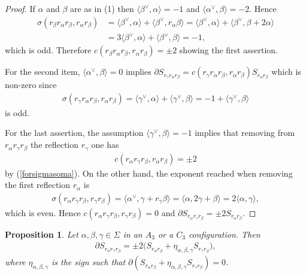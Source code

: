 \documentclass[pdftex]{sigma}
\numberwithin{equation}{section}
\newtheorem{Proposition}[Theorem]{Proposition}
 { \theoremstyle{definition}
\newtheorem{Definition}[Theorem]{Definition}
\newtheorem{Note}[Theorem]{Note}
\newtheorem{Example}[Theorem]{Example}
\newtheorem{Remark}[Theorem]{Remark} }
\begin{document}
\begin{proof}If $\alpha $ and $\beta $ are as in (1) then $\langle \beta ^{\vee},\alpha \rangle =-1$ and $\langle \alpha ^{\vee },\beta\rangle =-2$. Hence
\begin{align*}
\sigma ( r_{\beta }r_{\alpha }r_{\beta },r_{\alpha }r_{\beta } )&=\langle \beta ^{\vee },\alpha \rangle +\langle \beta ^{\vee },r_{\alpha}\beta \rangle =\langle \beta ^{\vee },\alpha \rangle +\langle \beta ^{\vee },\beta
+2\alpha \rangle \\
&=3\langle \beta ^{\vee },\alpha \rangle +\langle \beta ^{\vee },\beta\rangle =-1,
\end{align*}
which is odd. Therefore $c ( r_{\beta }r_{\alpha }r_{\beta },r_{\alpha}r_{\beta } ) =\pm 2$ showing the first assertion.

For the second item, $ \langle \alpha ^{\vee },\beta \rangle =0$ implies $\partial S_{r_{\gamma }r_{\alpha }r_{\beta }}=c(r_{\gamma}r_{\alpha }r_{\beta },r_{\alpha }r_{\beta })S_{r_{\alpha }r_{\beta }}$ which is non-zero since
\begin{gather*}
\sigma (r_{\gamma }r_{\alpha }r_{\beta },r_{\alpha }r_{\beta })= \langle \gamma ^{\vee },\alpha \rangle + \langle \gamma ^{\vee },\beta \rangle =-1+ \langle \gamma ^{\vee },\beta \rangle
\end{gather*}
is odd.

For the last assertion, the assumption $\langle \gamma ^{\vee },\beta \rangle =-1$ implies that removing from $r_{\alpha }r_{\gamma }r_{\beta }$ the reflection $r_{\gamma }$ one has
\begin{gather*}
c ( r_{\alpha }r_{\gamma }r_{\beta },r_{\alpha }r_{\beta } ) =\pm 2
\end{gather*}%
by (\ref{forsigmasoma}). On the other hand, the exponent reached when removing the first reflection $r_{\alpha }$ is
\begin{gather*}
\sigma ( r_{\alpha }r_{\gamma }r_{\beta },r_{\gamma }r_{\beta } ) =\langle \alpha ^{\vee },\gamma +r_{\gamma }\beta \rangle =\langle \alpha,2\gamma +\beta \rangle =2\langle \alpha,\gamma \rangle,
\end{gather*}
which is even. Hence $c ( r_{\alpha }r_{\gamma }r_{\beta },r_{\gamma}r_{\beta } ) =0$ and $\partial S_{r_{\alpha }r_{\gamma }r_{\beta}}=\pm 2S_{r_{\alpha }r_{\beta }}$.
\end{proof}

\begin{Proposition}\label{pro.bound3A3}Let $\alpha,\beta,\gamma \in \Sigma $ in an $A_{3}$ or a $C_{3}$ configuration. Then
\begin{gather*}
\partial S_{r_{\alpha }r_{\gamma }r_{\beta }}=\pm 2\big( S_{r_{\alpha}r_{\beta }}+\eta _{\alpha,\beta,\gamma }S_{r_{\gamma }r_{\beta }}\big),
\end{gather*}
where $\eta _{\alpha,\beta,\gamma }$ is the sign such that $\partial ( S_{r_{\alpha }r_{\beta }}+\eta _{\alpha,\beta,\gamma }S_{r_{\gamma}r_{\beta }}) =0$.
\end{Proposition}
\end{document}
